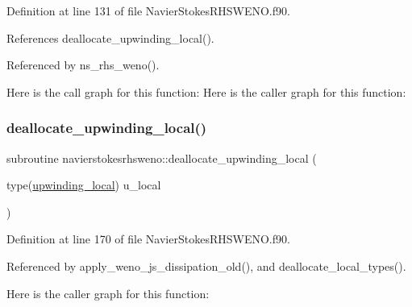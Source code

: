 Definition at line 131 of file Navier\+Stokes\+R\+H\+S\+W\+E\+N\+O.\+f90.



References deallocate\+\_\+upwinding\+\_\+local().



Referenced by ns\+\_\+rhs\+\_\+weno().

Here is the call graph for this function\+:
Here is the caller graph for this function\+:
\hypertarget{namespacenavierstokesrhsweno_af0672aeaf819970b43963e86448c91ad}{}\label{namespacenavierstokesrhsweno_af0672aeaf819970b43963e86448c91ad} 
\subsubsection{\texorpdfstring{deallocate\+\_\+upwinding\+\_\+local()}{deallocate\_upwinding\_local()}}
{\footnotesize\ttfamily subroutine navierstokesrhsweno\+::deallocate\+\_\+upwinding\+\_\+local (\begin{DoxyParamCaption}\item[{type(\hyperlink{structnavierstokesrhsweno_1_1upwinding__local}{upwinding\+\_\+local})}]{u\+\_\+local }\end{DoxyParamCaption})}



Definition at line 170 of file Navier\+Stokes\+R\+H\+S\+W\+E\+N\+O.\+f90.



Referenced by apply\+\_\+weno\+\_\+js\+\_\+dissipation\+\_\+old(), and deallocate\+\_\+local\+\_\+types().

Here is the caller graph for this function\+:
\hypertarget{namespacenavierstokesrhsweno_a5a6e0cc7f0cfcab7d3db0700b7eda393}{}\label{namespacenavierstokesrhsweno_a5a6e0cc7f0cfcab7d3db0700b7eda393} 
